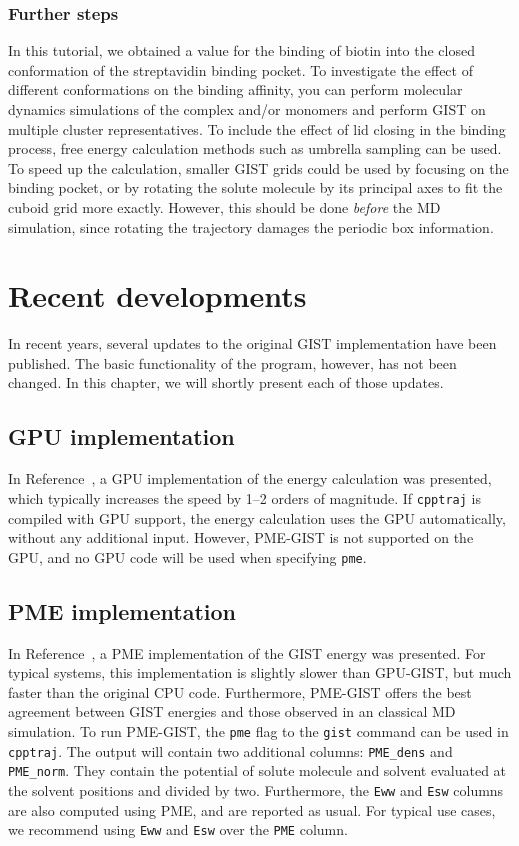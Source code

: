 \documentclass[9pt,tutorial]{livecoms}
\newcommand{\software}{\texttt}
\newcommand\inlinecode{\texttt}
\begin{document}
\subsubsection{Further steps}
In this tutorial, we obtained a value for the binding of biotin into the closed conformation of the streptavidin binding pocket.
To investigate the effect of different conformations on the binding affinity, you can perform molecular dynamics simulations of the complex and/or monomers and perform GIST on multiple cluster representatives.
To include the effect of lid closing in the binding process, free energy calculation methods such as umbrella sampling can be used.
To speed up the calculation, smaller GIST grids could be used by focusing on the binding pocket, or by rotating the solute molecule by its principal axes to fit the cuboid grid more exactly.
However, this should be done \emph{before} the MD simulation, since rotating the trajectory damages the periodic box information.

\section{Recent developments}
In recent years, several updates to the original GIST implementation have been published.
The basic functionality of the program, however, has not been changed.
In this chapter, we will shortly present each of those updates.
\subsection{GPU implementation}
In Reference~\cite{Kraml2020}, a GPU implementation of the energy calculation was presented, which typically increases the speed by 1--2 orders of magnitude.
If \software{cpptraj} is compiled with GPU support, the energy calculation uses the GPU automatically, without any additional input.
However, PME-GIST is not supported on the GPU, and no GPU code will be used when specifying \inlinecode{pme}.

\subsection{PME implementation}
In Reference~\cite{Chen2021}, a PME implementation of the GIST energy was presented.
For typical systems, this implementation is slightly slower than GPU-GIST, but much faster than the original CPU code.
Furthermore, PME-GIST offers the best agreement between GIST energies and those observed in an classical MD simulation.
To run PME-GIST, the \inlinecode{pme} flag to the \inlinecode{gist} command can be used in \software{cpptraj}.
The output will contain two additional columns: \inlinecode{PME\_dens} and \inlinecode{PME\_norm}.
They contain the potential of solute molecule and solvent evaluated at the solvent positions and divided by two.
Furthermore, the \inlinecode{Eww} and \inlinecode{Esw} columns are also computed using PME, and are reported as usual.
For typical use cases, we recommend using \inlinecode{Eww} and \inlinecode{Esw} over the \inlinecode{PME} column.
\end{document}
